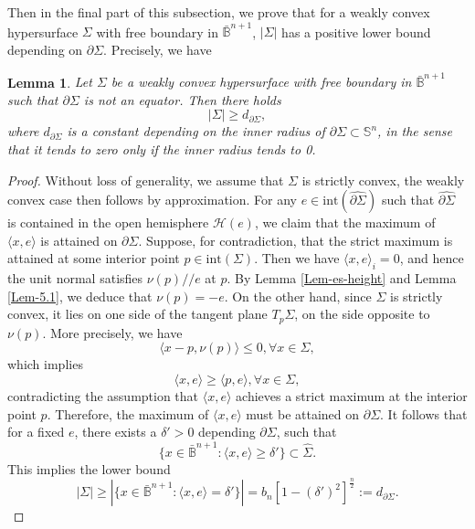 \documentclass[11pt,reqno]{amsart}
\newtheorem{lem}[thm]{Lemma}
\theoremstyle{definition}
\theoremstyle{remark}
\numberwithin{equation}{section}
\renewcommand{\(}{\left(}
\renewcommand{\)}{\right)}
\renewcommand{\-}{\overline}
\begin{document}
Then in the final part of this subsection, we prove that for a weakly convex hypersurface $\Sigma$ with free boundary in $\bar{\mathbb{B}}^{n+1}$, $|\Sigma|$ has a positive lower bound depending on $\partial\Sigma$. Precisely, we have
\begin{lem}\label{Lower-bound}
	Let $\Sigma$ be a weakly convex hypersurface with free boundary in $\bar{\mathbb{B}}^{n+1}$ such that $\partial\Sigma$ is not an equator. Then there holds
	\begin{equation}
		|\Sigma|\geq d_{\partial\Sigma},
	\end{equation}
	where $d_{\partial\Sigma}$ is a constant depending on the inner radius of $\partial\Sigma\subset\mathbb{S}^n$, in the sense that it tends to zero only if the inner radius tends to 0.
\end{lem}
\begin{proof}
	Without loss of generality, we assume that $\Sigma$ is strictly convex, the weakly convex case then follows by approximation. For any $e\in\mathrm{int}(\widehat{\partial\Sigma})$ such that $\widehat{\partial\Sigma}$ is contained in the open hemisphere $\mathcal{H}(e)$, we claim that the maximum of $\langle x,e\rangle$ is attained on $\partial\Sigma$. Suppose, for contradiction, that the strict maximum is attained at some interior point
	$p\in\mathrm{int}(\Sigma)$. Then we have $\langle x,e\rangle_i=0$,  and hence the unit normal satisfies $\nu(p)//e$ at $p$. By Lemma \ref{Lem-es-height} and Lemma \ref{Lem-5.1}, we deduce that $\nu(p)=-e$. On the other hand, since $\Sigma$ is strictly convex, it lies on one side of the tangent plane $T_p\Sigma$, on the side opposite to $\nu(p)$. More precisely, we have
	\begin{equation*}
		\langle x-p,\nu(p)\rangle\leq 0,\forall x\in\Sigma,
	\end{equation*}
which implies
\begin{equation*}
\langle x,e\rangle\geq \langle p,e\rangle, \forall x\in\Sigma,
\end{equation*}
contradicting the assumption that $\langle x,e\rangle$ achieves a strict maximum at the interior point  $p$. Therefore,  the maximum of $\langle x,e\rangle$ must be attained on $\partial\Sigma$. It follows that for a fixed $e$, there exists a $\delta'>0$ depending $\partial\Sigma$, such that 
\begin{equation}
	\{x\in\bar{\mathbb{B}}^{n+1}:\langle x,e\rangle\geq\delta'\}\subset \widehat{\Sigma}.
\end{equation}
This implies the lower bound
\begin{equation*}
	|\Sigma|\geq |\{x\in\bar{\mathbb{B}}^{n+1}:\langle x,e\rangle=\delta'\}|=b_n\left[1-(\delta')^2\right]^{\frac{n}{2}}:=d_{\partial\Sigma}.
\end{equation*}
\end{proof}
\end{document}

